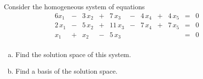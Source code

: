 
\begin{exerciseStatement}


Consider the homogeneous system of equations 
\begin{alignat*}{6} x_{1} &-& 3 \, x_{2} &+& 7 \, x_{3} &-& 4 \, x_{4} &+& 4 \, x_{5} &=& 0 \\2 \, x_{1} &-& 5 \, x_{2} &+& 11 \, x_{3} &-& 7 \, x_{4} &+& 7 \, x_{5} &=& 0 \\x_{1} &+& x_{2} &-& 5 \, x_{3} & &  & &  &=& 0 \\ \end{alignat*}
            


\begin{enumerate}[(a)]
\item  Find the solution space of this system.
\item  Find a basis of the solution space.
\end{enumerate}
    
\end{exerciseStatement}
    
